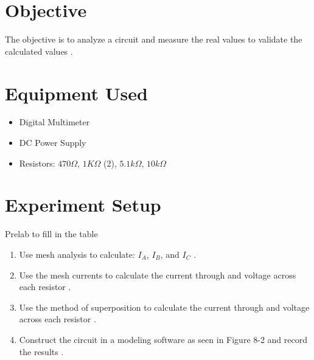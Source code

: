 \documentclass[a4paper]{article}
\begin{document}
\section{Objective}
The objective is to analyze a circuit and measure the real values to validate the calculated values \cite{UNCC-ECE-Dept:2023}.
\section{Equipment Used}

\begin{itemize}
    \item Digital Multimeter
    \item DC Power Supply
    \item Resistors: $470\Omega$, $1K\Omega$ (2), $5.1k\Omega$, $10k\Omega$ 
\end{itemize}

\section{Experiment Setup}
Prelab to fill in the table\\
\begin{enumerate}
    \item Use mesh analysis to calculate: $I_{A}$, $I_{B}$, and $I_{C}$ \cite{UNCC-ECE-Dept:2023}.
    \item Use the mesh currents to calculate the current through and voltage across each resistor \cite{UNCC-ECE-Dept:2023}.
    \item Use the method of superposition to calculate the current through and voltage across each resistor \cite{UNCC-ECE-Dept:2023}.
    \item Construct the circuit in a modeling software as seen in Figure 8-2 and record the results \cite{UNCC-ECE-Dept:2023}. 
\end{enumerate}
\end{document}
